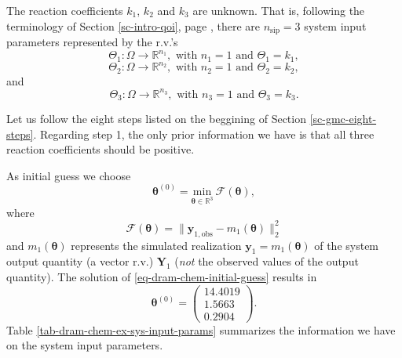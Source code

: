 The reaction coefficients $k_1$, $k_2$ and $k_3$ are unknown.
That is,
following the terminology of Section \ref{sc-intro-qoi}, page \pageref{sc-intro-qoi},
there are $n_{\text{sip}}=3$ system input parameters
represented by the r.v.'s
\begin{equation*}
\Theta_1:\Omega\rightarrow\mathbb{R}^{n_1},\text{ with }n_1=1\text{ and }\Theta_1=k_1,
\end{equation*}
\begin{equation*}
\Theta_2:\Omega\rightarrow\mathbb{R}^{n_2},\text{ with }n_2=1\text{ and }\Theta_2=k_2,
\end{equation*}
and
\begin{equation*}
\Theta_3:\Omega\rightarrow\mathbb{R}^{n_3},\text{ with }n_3=1\text{ and }\Theta_3=k_3.
\end{equation*}

Let us follow the eight steps listed on the beggining of Section \ref{sc-gmc-eight-steps}.
Regarding step 1,
the only prior information we have is that all three reaction coefficients should be positive.

As initial guess we choose
\begin{equation}\label{eq-dram-chem-initial-guess}
\boldsymbol{\theta}^{(0)} = \underset{\boldsymbol{\theta}\in\mathbb{R}^3}{\text{min}}~\mathcal{F}(\boldsymbol{\theta}),
\end{equation}
where
\begin{equation*}
\mathcal{F}(\boldsymbol{\theta}) = \|\mathbf{y}_{1,\text{obs}}-m_1(\boldsymbol{\theta})\|_2^2
\end{equation*}
and $m_1(\boldsymbol{\theta})$ represents the simulated realization $\mathbf{y}_1=m_1(\boldsymbol{\theta})$ of the system output quantity (a vector r.v.) $\mathbf{Y}_1$ ({\it not} the observed values of the output quantity).
The solution of \eqref{eq-dram-chem-initial-guess} results in
\begin{equation*}
\boldsymbol{\theta}^{(0)}
=
\left(
\begin{array}{c}
14.4019 \\
 1.5663 \\
 0.2904
\end{array}
\right).
\end{equation*}
Table \ref{tab-dram-chem-ex-sys-input-params} summarizes the information we have on the system input parameters.


